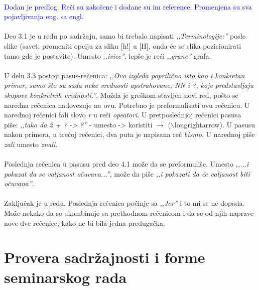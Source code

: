 \documentclass[a4paper]{report}
\newcommand{\odgovor}[1]{\textcolor{blue}{#1}}
\begin{document}
\\
\odgovor{Dodan je predlog. Reči su zakošene i dodane su im reference. Promenjena su sva pojavljivanja eng. sa engl.}
\\
\\
Deo 3.1 je u redu po sadržaju, samo bi trebalo napisati \textit{‚‚Terminologije:''} posle slike (savet: promeniti opciju za sliku [h!] u [H], onda će se slika pozicionirati tamo gde je postavite). Umesto \textit{‚‚ivice''}, lepše je reći \textit{‚‚grane''} grafa.
\\
\\
U delu 3.3 postoji pasus-rečenica: \textit{‚‚Ovo izgleda poprilično isto kao i konkretan primer, samo što su sada neke vrednosti apstrahovane, NN i ?, koje predstavljaju skupove konkretnih vrednosti.''}. Možda je greškom stavljen novi red, pošto se naredna rečenica nadovezuje na ovu. Potrebno je preformulisati ovu rečenicu. U narednoj rečenici fali slovo \textit{r} u reči \textit{opeatori}. U pretposlednjoj rečenici pasusa piše: \textit{‚‚tako da 2 + ? -> ?''} - umesto -> koristiti $\longrightarrow$ ($\backslash$longrightarrow). U pasusu nakon primera, u trećoj rečenici, dva puta je napisana reč \textit{bismo}. U narednoj piše \textit{zali} umesto \textit{znali}.
\\
\\ 
Poslednja rečenica u pasusu pred deo 4.1 može da se preformuliše. Umesto \textit{‚‚...i pokazat da se valjanost očuvava...''}, može da piše \textit{‚‚i pokazati da će valjanost biti očuvana''}.
\\
\\
Zaključak je u redu. Poslednja rečenica počinje sa \textit{‚‚Jer''} i to mi se ne dopada. Može nekako da se ukombinuje sa prethodnom rečenicom i da se od njih naprave nove dve rečenice, kako ne bi bila jedna predugačka.

\section{Provera sadržajnosti i forme seminarskog rada}
\end{document}
